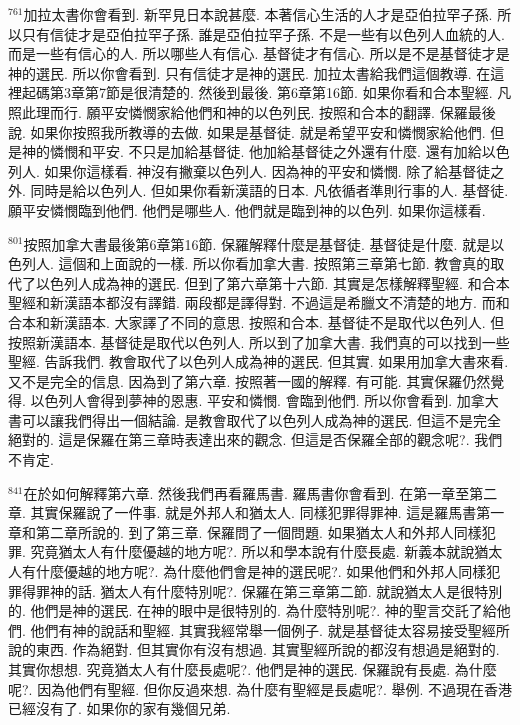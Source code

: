 \documentclass{book}
\begin{document}
$^{761}$加拉太書你會看到.
新罕見日本說甚麼.
本著信心生活的人才是亞伯拉罕子孫.
所以只有信徒才是亞伯拉罕子孫.
誰是亞伯拉罕子孫.
不是一些有以色列人血統的人.
而是一些有信心的人.
所以哪些人有信心.
基督徒才有信心.
所以是不是基督徒才是神的選民.
所以你會看到.
只有信徒才是神的選民.
加拉太書給我們這個教導.
在這裡起碼第3章第7節是很清楚的.
然後到最後.
第6章第16節.
如果你看和合本聖經.
凡照此理而行.
願平安憐憫家給他們和神的以色列民.
按照和合本的翻譯.
保羅最後說.
如果你按照我所教導的去做.
如果是基督徒.
就是希望平安和憐憫家給他們.
但是神的憐憫和平安.
不只是加給基督徒.
他加給基督徒之外還有什麼.
還有加給以色列人.
如果你這樣看.
神沒有撇棄以色列人.
因為神的平安和憐憫.
除了給基督徒之外.
同時是給以色列人.
但如果你看新漢語的日本.
凡依循者準則行事的人.
基督徒.
願平安憐憫臨到他們.
他們是哪些人.
他們就是臨到神的以色列.
如果你這樣看.

$^{801}$按照加拿大書最後第6章第16節.
保羅解釋什麼是基督徒.
基督徒是什麼.
就是以色列人.
這個和上面說的一樣.
所以你看加拿大書.
按照第三章第七節.
教會真的取代了以色列人成為神的選民.
但到了第六章第十六節.
其實是怎樣解釋聖經.
和合本聖經和新漢語本都沒有譯錯.
兩段都是譯得對.
不過這是希臘文不清楚的地方.
而和合本和新漢語本.
大家譯了不同的意思.
按照和合本.
基督徒不是取代以色列人.
但按照新漢語本.
基督徒是取代以色列人.
所以到了加拿大書.
我們真的可以找到一些聖經.
告訴我們.
教會取代了以色列人成為神的選民.
但其實.
如果用加拿大書來看.
又不是完全的信息.
因為到了第六章.
按照著一國的解釋.
有可能.
其實保羅仍然覺得.
以色列人會得到夢神的恩惠.
平安和憐憫.
會臨到他們.
所以你會看到.
加拿大書可以讓我們得出一個結論.
是教會取代了以色列人成為神的選民.
但這不是完全絕對的.
這是保羅在第三章時表達出來的觀念.
但這是否保羅全部的觀念呢?.
我們不肯定.

$^{841}$在於如何解釋第六章.
然後我們再看羅馬書.
羅馬書你會看到.
在第一章至第二章.
其實保羅說了一件事.
就是外邦人和猶太人.
同樣犯罪得罪神.
這是羅馬書第一章和第二章所說的.
到了第三章.
保羅問了一個問題.
如果猶太人和外邦人同樣犯罪.
究竟猶太人有什麼優越的地方呢?.
所以和學本說有什麼長處.
新義本就說猶太人有什麼優越的地方呢?.
為什麼他們會是神的選民呢?.
如果他們和外邦人同樣犯罪得罪神的話.
猶太人有什麼特別呢?.
保羅在第三章第二節.
就說猶太人是很特別的.
他們是神的選民.
在神的眼中是很特別的.
為什麼特別呢?.
神的聖言交託了給他們.
他們有神的說話和聖經.
其實我經常舉一個例子.
就是基督徒太容易接受聖經所說的東西.
作為絕對.
但其實你有沒有想過.
其實聖經所說的都沒有想過是絕對的.
其實你想想.
究竟猶太人有什麼長處呢?.
他們是神的選民.
保羅說有長處.
為什麼呢?.
因為他們有聖經.
但你反過來想.
為什麼有聖經是長處呢?.
舉例.
不過現在香港已經沒有了.
如果你的家有幾個兄弟.
\end{document}
